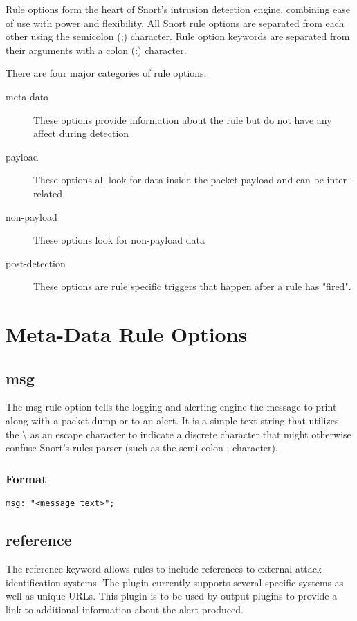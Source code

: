 \documentclass[english]{report}
\begin{document}
Rule options form the heart of Snort's intrusion detection engine, combining
ease of use with power and flexibility. All Snort rule options are separated
from each other using the semicolon (;) character. Rule option keywords are
separated from their arguments with a colon (:) character. 

There are four major categories of rule options.  
\begin{description}
\item [meta-data] These options provide information about the rule but do not have any affect during detection 
\item [payload] These options all look for data inside the packet payload and can be inter-related
\item [non-payload] These options look for non-payload data
\item [post-detection] These options are rule specific triggers that happen after a rule has "fired".
\end{description}

\section{Meta-Data Rule Options}

\subsection{msg}

The msg rule option tells the logging and alerting engine the message to print
along with a packet dump or to an alert. It is a simple text string that
utilizes the \textbackslash{} as an escape character to indicate a discrete
character that might otherwise confuse Snort's rules parser (such as the
semi-colon ; character).

\subsubsection{Format}

\begin{verbatim}
msg: "<message text>";
\end{verbatim}

\subsection{reference}

The reference keyword allows rules to include references to external
attack identification systems. The plugin currently supports several
specific systems as well as unique URLs. This plugin is to be used
by output plugins to provide a link to additional information about
the alert produced.
\end{document}
